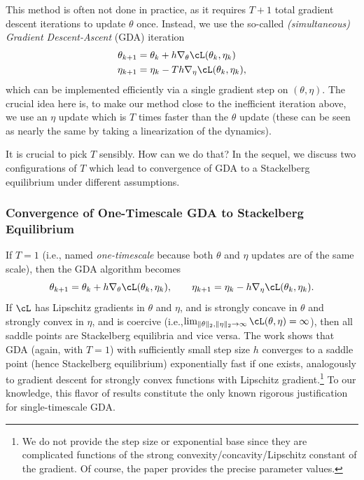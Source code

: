 \documentclass[../../book-main.tex]{subfiles}
\begin{document}
This method is often not done in practice, as it requires \(T + 1\) total gradient descent iterations to update \(\theta\) once. Instead, we use the so-called \textit{(simultaneous) Gradient Descent-Ascent} (GDA) iteration
\begin{align}
    \theta_{k + 1}
    &= \theta_{k} + h\nabla_{\theta}\cL(\theta_{k}, \eta_{k}) \\ 
    \eta_{k + 1}
    &= \eta_{k} - Th\nabla_{\eta}\cL(\theta_{k}, \eta_{k}),
\end{align}
which can be implemented efficiently via a single gradient step on \((\theta, \eta)\). The crucial idea here is, to make our method close to the inefficient iteration above, we use an \(\eta\) update which is \(T\) times faster than the \(\theta\) update (these can be seen as nearly the same by taking a linearization of the dynamics).

It is crucial to pick \(T\) sensibly. How can we do that? In the sequel, we discuss two configurations of \(T\) which lead to convergence of GDA to a Stackelberg equilibrium under different assumptions.

\subsubsection{Convergence of One-Timescale GDA to Stackelberg Equilibrium}

If \(T = 1\) (i.e., named \textit{one-timescale} because both \(\theta\) and \(\eta\) updates are of the same scale), then the GDA algorithm becomes 
\begin{equation}
    \theta_{k + 1} = \theta_{k} + h\nabla_{\theta}\cL(\theta_{k}, \eta_{k}), \qquad \eta_{k + 1} = \eta_{k} - h\nabla_{\eta}\cL(\theta_{k}, \eta_{k}).
\end{equation}
If \(\cL\) has Lipschitz gradients in \(\theta\) and \(\eta\), and is strongly concave in \(\theta\) and strongly convex in \(\eta\), and is coercive (i.e.,\(\lim_{\norm{\theta}_{2}, \norm{\eta}_{2} \to \infty}\cL(\theta, \eta) = \infty\)), then all saddle points are Stackelberg equilibria and vice versa. The work \cite{zamani2024convergence} shows that GDA (again, with \(T = 1\)) with sufficiently small step size \(h\) converges to a saddle point (hence Stackelberg equilibrium) exponentially fast if one exists, analogously to gradient descent for strongly convex functions with Lipschitz gradient.\footnote{We do not provide the step size or exponential base since they are complicated functions of the strong convexity/concavity/Lipschitz constant of the gradient. Of course, the paper \cite{zamani2024convergence} provides the precise parameter values.} To our knowledge, this flavor of results constitute the only known rigorous justification for single-timescale GDA.
\end{document}
